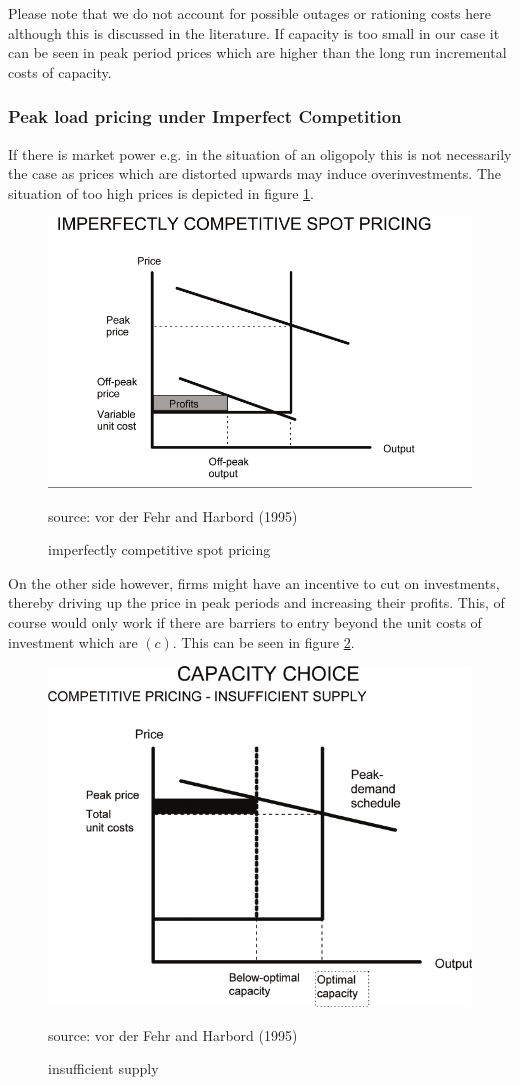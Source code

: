 Please note that we do not account for possible outages or rationing costs here although this is discussed in the literature. If capacity is too small in our case it can be seen in peak period prices which are higher than the long run incremental costs of capacity.

\subsubsection{Peak load pricing under Imperfect Competition}

If there is market power e.g. in the situation of an oligopoly this is not necessarily the case as prices which are distorted upwards may induce overinvestments. The situation of too high prices is depicted in figure \ref{peak_load_toohigh}. 

\begin{figure}[h]
\centering
\includegraphics[width=.5\textwidth]{capacity/peak_load_toohigh}
      \label{peak_load_toohigh}            
      \caption{imperfectly competitive spot pricing}
       source: vor der Fehr and Harbord (1995)
\end{figure}

On the other side however, firms might have an incentive to cut on investments, thereby driving up the price in peak periods and increasing their profits. This, of course would only work if there are barriers to entry beyond the unit costs of investment which are $(c)$. This can be seen in figure \ref{peak_load_insufficient}.

\begin{figure}[h]
\centering
\includegraphics[width=.5\textwidth]{capacity/peak_load_insufficient}
      \label{peak_load_insufficient}            
      \caption{insufficient supply}
       source: vor der Fehr and Harbord (1995)
\end{figure}

